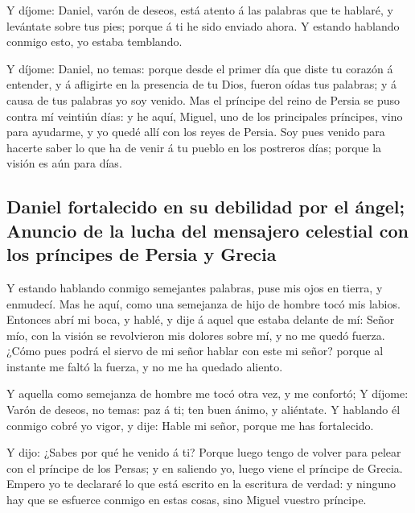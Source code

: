  Y díjome: Daniel, varón de deseos, está atento á las
palabras que te hablaré, y levántate sobre tus pies; porque á ti he sido
enviado ahora. Y estando hablando conmigo esto, yo estaba temblando.

 Y díjome: Daniel, no temas: porque desde el primer día que
diste tu corazón á entender, y á afligirte en la presencia de tu Dios,
fueron oídas tus palabras; y á causa de tus palabras yo soy venido.
 Mas el príncipe del reino de Persia se puso contra mí
veintiún días: y he aquí, Miguel, uno de los principales príncipes, vino
para ayudarme, y yo quedé allí con los reyes de Persia. 
Soy pues venido para hacerte saber lo que ha de venir á tu pueblo en los
postreros días; porque la visión es aún para días.

\hypertarget{daniel-fortalecido-en-su-debilidad-por-el-uxe1ngel-anuncio-de-la-lucha-del-mensajero-celestial-con-los-pruxedncipes-de-persia-y-grecia}{%
\subsection{Daniel fortalecido en su debilidad por el ángel; Anuncio de
la lucha del mensajero celestial con los príncipes de Persia y
Grecia}\label{daniel-fortalecido-en-su-debilidad-por-el-uxe1ngel-anuncio-de-la-lucha-del-mensajero-celestial-con-los-pruxedncipes-de-persia-y-grecia}}

 Y estando hablando conmigo semejantes palabras, puse mis
ojos en tierra, y enmudecí.  Mas he aquí, como una
semejanza de hijo de hombre tocó mis labios. Entonces abrí mi boca, y
hablé, y dije á aquel que estaba delante de mí: Señor mío, con la visión
se revolvieron mis dolores sobre mí, y no me quedó fuerza. 
¿Cómo pues podrá el siervo de mi señor hablar con este mi señor? porque
al instante me faltó la fuerza, y no me ha quedado aliento.

 Y aquella como semejanza de hombre me tocó otra vez, y me
confortó;  Y díjome: Varón de deseos, no temas: paz á ti;
ten buen ánimo, y aliéntate. Y hablando él conmigo cobré yo vigor, y
dije: Hable mi señor, porque me has fortalecido.

 Y dijo: ¿Sabes por qué he venido á ti? Porque luego tengo
de volver para pelear con el príncipe de los Persas; y en saliendo yo,
luego viene el príncipe de Grecia.  Empero yo te declararé
lo que está escrito en la escritura de verdad: y ninguno hay que se
esfuerce conmigo en estas cosas, sino Miguel vuestro príncipe.

